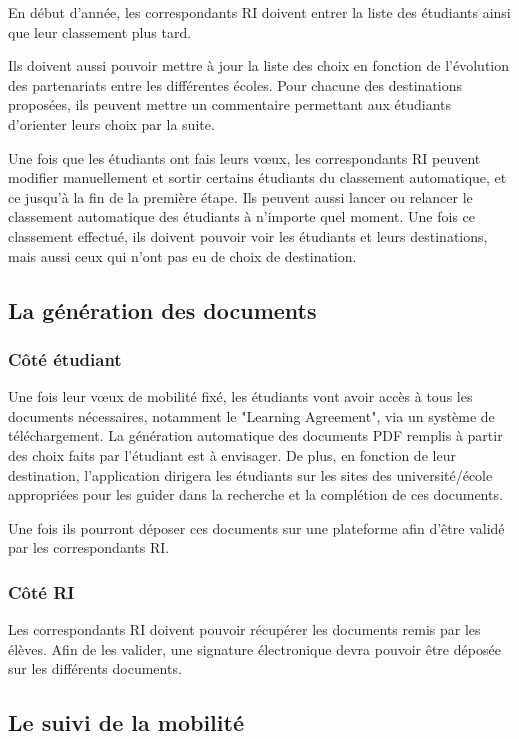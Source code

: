 \documentclass{rapport}
\begin{document}
		En début d'année, les correspondants RI doivent entrer la liste des étudiants ainsi que leur classement plus tard. 
		
		Ils doivent aussi pouvoir mettre à jour la liste des choix en fonction de l'évolution des partenariats entre les différentes écoles. Pour chacune des destinations proposées, ils peuvent mettre un commentaire permettant aux étudiants d'orienter leurs choix par la suite.
		
		Une fois que les étudiants ont fais leurs vœux, les correspondants RI peuvent modifier manuellement et sortir certains étudiants du classement automatique, et ce jusqu'à la fin de la première étape. Ils peuvent aussi lancer ou relancer le classement automatique des étudiants à n'importe quel moment. Une fois ce classement effectué, ils doivent pouvoir voir les étudiants et leurs destinations, mais aussi ceux qui n'ont pas eu de choix de destination.
		
		\subsection{La génération des documents}
		
		\subsubsection{Côté étudiant}
		
		Une fois leur vœux de mobilité fixé, les étudiants vont avoir accès à tous les documents nécessaires, notamment le "Learning Agreement", via un système de téléchargement. La génération automatique des documents PDF remplis à partir des choix faits par l'étudiant est à envisager. De plus, en fonction de leur destination, l'application dirigera les étudiants sur les sites des université/école appropriées pour les guider dans la recherche et la complétion de ces documents.
		
		Une fois ils pourront déposer ces documents sur une plateforme afin d'être validé par les correspondants RI.
	
		\subsubsection{Côté RI}
		
		Les correspondants RI doivent pouvoir récupérer les documents remis par les élèves. Afin de les valider, une signature électronique devra pouvoir être déposée sur les différents documents. 
		
		\subsection{Le suivi de la mobilité}
		
\end{document}
